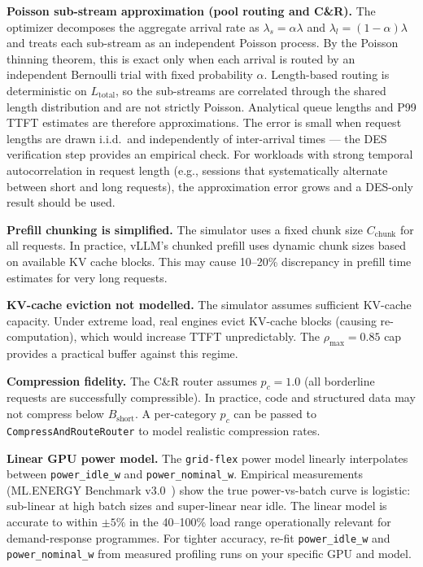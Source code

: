 \documentclass[11pt,a4paper]{article}
\newcommand{\Bshort}{B_{\text{short}}}
\begin{document}
\textbf{Poisson sub-stream approximation (pool routing and C\&R).}
The optimizer decomposes the aggregate arrival rate as
$\lambda_s = \alpha\lambda$ and $\lambda_l = (1-\alpha)\lambda$ and
treats each sub-stream as an independent Poisson process.
By the Poisson thinning theorem, this is exact only when each arrival
is routed by an independent Bernoulli trial with fixed probability
$\alpha$.  Length-based routing is deterministic on $L_{\text{total}}$,
so the sub-streams are correlated through the shared length distribution
and are not strictly Poisson.  Analytical queue lengths and
P99 TTFT estimates are therefore approximations.
The error is small when request lengths are drawn i.i.d.\ and
independently of inter-arrival times --- the DES verification step
provides an empirical check.  For workloads with strong temporal
autocorrelation in request length (e.g., sessions that systematically
alternate between short and long requests), the approximation error
grows and a DES-only result should be used.

\textbf{Prefill chunking is simplified.}
The simulator uses a fixed chunk size $C_{\text{chunk}}$ for all requests.
In practice, vLLM's chunked prefill uses dynamic chunk sizes based on
available KV cache blocks.  This may cause 10--20\% discrepancy in
prefill time estimates for very long requests.

\textbf{KV-cache eviction not modelled.}
The simulator assumes sufficient KV-cache capacity.  Under extreme load,
real engines evict KV-cache blocks (causing re-computation), which would
increase TTFT unpredictably.  The $\rho_{\max} = 0.85$ cap provides
a practical buffer against this regime.

\textbf{Compression fidelity.}
The C\&R router assumes $p_c = 1.0$ (all borderline requests are
successfully compressible).  In practice, code and structured data
may not compress below $\Bshort$.  A per-category $p_c$ can be passed
to \texttt{CompressAndRouteRouter} to model realistic compression rates.

\textbf{Linear GPU power model.}
The \texttt{grid-flex} power model linearly interpolates between
\texttt{power\_idle\_w} and \texttt{power\_nominal\_w}.  Empirical
measurements (ML.ENERGY Benchmark v3.0~\citep{chung2025mlenergy}) show the
true power-vs-batch curve is logistic: sub-linear at high batch sizes and
super-linear near idle.  The linear model is accurate to within $\pm5\%$
in the 40--100\% load range operationally relevant for demand-response
programmes.  For tighter accuracy, re-fit \texttt{power\_idle\_w} and
\texttt{power\_nominal\_w} from measured profiling runs on your specific
GPU and model.
\end{document}
